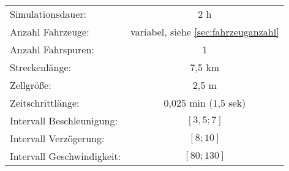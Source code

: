 \begin{table}[hptb]
\begin{center}
\setlength{\tabcolsep}{0.5em} %
{\renewcommand{\arraystretch}{1.2}%
\begin{tabular}{ l  c }
\hline 
\hspace{1em}Simulationsdauer:\hspace{1em} & \hspace{1em}2 h\hspace{1em} \\
\hspace{1em}Anzahl Fahrzeuge:\hspace{1em} & \hspace{1em}variabel, siehe \cref{sec:fahrzeuganzahl}\hspace{1em} \\
\hspace{1em}Anzahl Fahrspuren:\hspace{1em} & \hspace{1em}1\hspace{1em} \\
\hspace{1em}Streckenlänge:\hspace{1em} & \hspace{1em}7,5 km\hspace{1em} \\
\hspace{1em}Zellgröße:\hspace{1em} & \hspace{1em}2,5 m\hspace{1em} \\
\hspace{1em}Zeitschrittlänge:\hspace{1em} & \hspace{1em}0,025 min (1,5 sek)\hspace{1em} \\
\hspace{1em}Intervall Beschleunigung:\hspace{1em} & \hspace{1em}$ [3,5; 7] $\hspace{1em} \\
\hspace{1em}Intervall Verzögerung:\hspace{1em} & \hspace{1em}$ [8; 10] $\hspace{1em} \\
\hspace{1em}Intervall Geschwindigkeit:\hspace{1em} & \hspace{1em}$ [80; 130] $\hspace{1em} \\

\end{tabular}}
\end{center}
\end{table}
